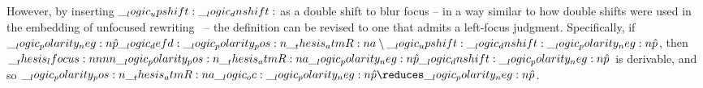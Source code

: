 However, by inserting $\up \dn$ as a double shift to blur focus -- in a way similar to how double shifts were used in the embedding of unfocused rewriting~ -- the definition can be revised to one that admits a left-focus judgment.
Specifically, if $\n{\defp{p}} \defd \p{\atmR{a}} \limp \up \dn \n{\defp{p}}$, then $\lfocus{\p{\atmR{a}}}{\n{\defp{p}}}{}{\dn \n{\defp{p}}}$ is derivable, and so $\p{\atmR{a}} \oc \n{\defp{p}} \reduces \n{\defp{p}}$.










